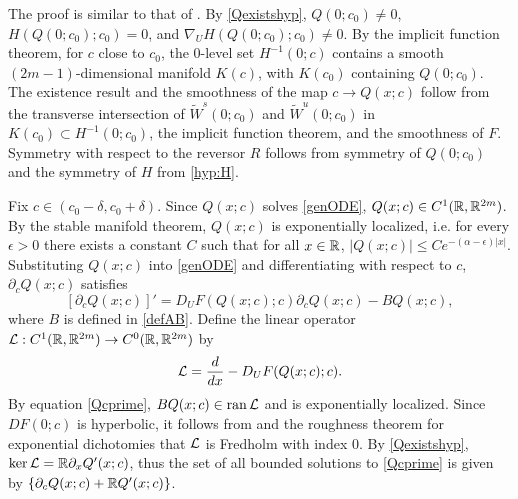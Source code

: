 \documentclass[10pt,reqno]{amsart}
\theoremstyle{plain}
\theoremstyle{definition}
\theoremstyle{remark}
\numberwithin{theorem}{section}
\numberwithin{equation}{section}
\begin{document}
The proof is similar to that of \cite[Lemma 6.2 and Lemma 6.4]{Kapitula2020}. By \cref{Qexistshyp}, $Q(0; c_0) \neq 0$, $H(Q(0; c_0); c_0) = 0$, and $\nabla_U H(Q(0; c_0); c_0) \neq 0$. By the implicit function theorem, for $c$ close to $c_0$, the 0-level set $H^{-1}(0; c)$ contains a smooth $(2m-1)$-dimensional manifold $K(c)$, with $K(c_0)$ containing $Q(0; c_0)$. The existence result and the smoothness of the map $c \rightarrow Q(x; c)$ follow from the transverse intersection of $\tilde{W}^s(0; c_0)$ and $\tilde{W}^u(0; c_0)$ in $K(c_0) \subset H^{-1}(0; c_0)$, the implicit function theorem, and the smoothness of $F$. Symmetry with respect to the reversor $R$ follows from symmetry of $Q(0; c_0)$ and the symmetry of $H$ from \cref{hyp:H}.

Fix $c \in (c_0 - \delta, c_0 + \delta)$. Since $Q(x; c)$ solves \ref{genODE}, $Q(x; c) \in C^1(\mathbb{R}, \mathbb{R}^{2m})$. By the stable manifold theorem, $Q(x; c)$ is exponentially localized, i.e. for every $\epsilon > 0$ there exists a constant $C$ such that for all $x \in \mathbb{R}$, $|Q(x; c)| \leq C e^{-(\alpha - \epsilon)|x|}$. Substituting $Q(x; c)$ into \cref{genODE} and differentiating with respect to $c$, $\partial_c Q(x; c)$ satisfies
\begin{equation}\label{Qcprime}
[\partial_c Q(x; c)]' = D_U F(Q(x;c); c) \partial_c Q(x; c) - B Q(x;c),
\end{equation}
where $B$ is defined in \cref{defAB}. Define the linear operator $\mathcal{L}: C^1(\mathbb{R}, \mathbb{R}^{2m}) \rightarrow C^0(\mathbb{R}, \mathbb{R}^{2m})$ by
\begin{equation}\label{defLtv}
\mathcal{L} = \frac{d}{dx} - D_U F(Q(x;c); c).
\end{equation}
By equation \cref{Qcprime}, $B Q(x;c) \in \operatorname{ran} \mathcal{L}$ and is exponentially localized. Since $DF(0; c)$ is hyperbolic, it follows from \cite[Lemma~4.2]{Palmer1984} and the roughness theorem for exponential dichotomies \cite{Coppel1978} that $\mathcal{L}$ is Fredholm with index 0. By \cref{Qexistshyp}, $\mathop\mathrm{ker}\nolimits \mathcal{L} = \mathbb{R} \partial_x Q'(x; c)$, thus the set of all bounded solutions to \cref{Qcprime} is given by $\{\partial_c Q(x; c) + \mathbb{R} Q'(x; c)\}$.
\end{document}
